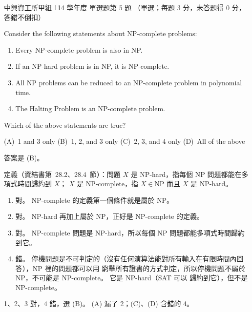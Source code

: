 \begin{pastexam}[label={px:nchu-114-dsa-05}]{中興資工所甲組 114 學年度 單選題第 5 題}
（單選；每題 3 分，未答題得 0 分，答錯不倒扣）

Consider the following statements about NP-complete problems:
\begin{enumerate}[label=\arabic*.]
\item Every NP-complete problem is also in NP.
\item If an NP-hard problem is in NP, it is NP-complete.
\item All NP problems can be reduced to an NP-complete problem in polynomial time.
\item The Halting Problem is an NP-complete problem.
\end{enumerate}
Which of the above statements are true?

(A)~1 and 3 only \qquad (B)~1, 2, and 3 only \qquad (C)~2, 3, and 4 only \qquad (D)~All of the above
\end{pastexam}

\begin{pastsoln}
答案是 (B)。

定義（資結書第~28.2、28.4~節）：問題 $X$ 是 NP-hard，指每個 NP 問題都能在多項式時間歸約到 $X$；
$X$ 是 NP-complete，指 $X \in \mathrm{NP}$ 而且 $X$ 是 NP-hard。
\begin{enumerate}
\item 對。 NP-complete 的定義第一個條件就是屬於 NP。
\item 對。 NP-hard 再加上屬於 NP，正好是 NP-complete 的定義。
\item 對。 NP-complete 問題是 NP-hard，所以每個 NP 問題都能多項式時間歸約到它。
\item 錯。 停機問題是不可判定的（沒有任何演算法能對所有輸入在有限時間內回答），NP 裡的問題都可以用
窮舉所有證書的方式判定，所以停機問題不屬於 NP，不可能是 NP-complete。 它是 NP-hard（SAT 可以
歸約到它），但不是 NP-complete。
\end{enumerate}
1、2、3 對，4 錯，選 (B)。 (A) 漏了 2；(C)、(D) 含錯的 4。
\end{pastsoln}
